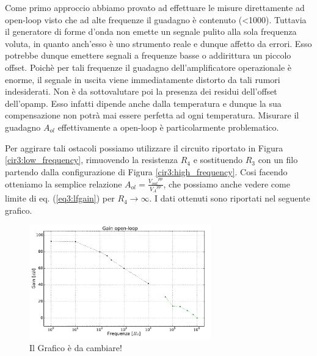 Come primo approccio abbiamo provato ad effettuare le misure direttamente ad open-loop visto che ad alte frequenze il guadagno è contenuto (\num{<1000}).
Tuttavia il generatore di forme d'onda non emette un segnale pulito alla sola frequenza voluta, in quanto anch'esso è uno strumento reale e dunque affetto da errori.
Esso potrebbe dunque emettere segnali a frequenze basse o addirittura un piccolo offset.
Poichè per tali frequenze il guadagno dell'amplificatore operazionale è enorme, il segnale in uscita viene immediatamente distorto da tali rumori indesiderati.
Non è da sottovalutare poi la presenza dei residui dell'offset dell'opamp.
Esso infatti dipende anche dalla temperatura e dunque la sua compensazione non potrà mai essere perfetta ad ogni temperatura.
Misurare il guadagno $A_{ol}$ effettivamente a open-loop è particolarmente problematico.

Per aggirare tali ostacoli possiamo utilizzare il circuito riportato in Figura \ref{cir3:low_frequency}, rimuovendo la resistenza $R_4$ e sostituendo $R_3$ con un filo partendo dalla configurazione di Figura \ref{cir3:high_frequency}.
Cosi facendo otteniamo la semplice relazione $A_{ol}=\frac{{V_{out}}^{pp}}{{V_A}^{pp}}$, che possiamo anche vedere come limite di eq. (\ref{eq3:lfgain}) per $R_4 \rightarrow \infty$.
I dati ottenuti sono riportati nel seguente grafico. 

\begin{figure}
	\centering
	\includegraphics[width=0.7\textwidth]{../E03/latex/gol.pdf}
	\caption{Il Grafico è da cambiare!}
  \label{cir3:gain_open_loop}
\end{figure}

